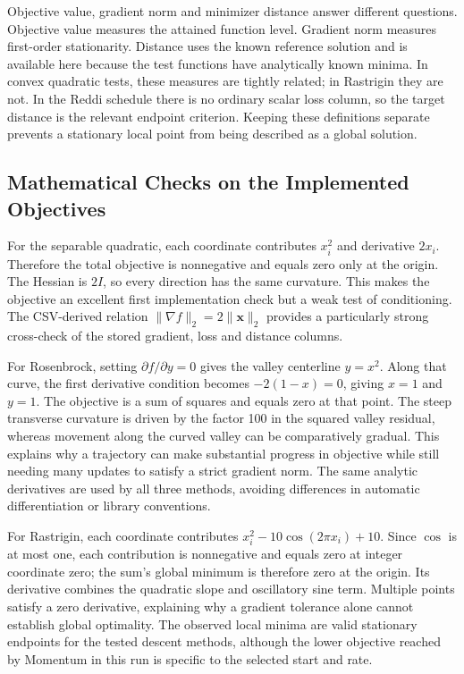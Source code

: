 ﻿\documentclass[conference]{IEEEtran}
\begin{document}
Objective value, gradient norm and minimizer distance answer different questions. Objective value measures the attained function level. Gradient norm measures first-order stationarity. Distance uses the known reference solution and is available here because the test functions have analytically known minima. In convex quadratic tests, these measures are tightly related; in Rastrigin they are not. In the Reddi schedule there is no ordinary scalar loss column, so the target distance is the relevant endpoint criterion. Keeping these definitions separate prevents a stationary local point from being described as a global solution.
\subsection{Mathematical Checks on the Implemented Objectives}
For the separable quadratic, each coordinate contributes $x_i^2$ and derivative $2x_i$. Therefore the total objective is nonnegative and equals zero only at the origin. The Hessian is $2I$, so every direction has the same curvature. This makes the objective an excellent first implementation check but a weak test of conditioning. The CSV-derived relation $\|\nabla f\|_2=2\|\mathbf{x}\|_2$ provides a particularly strong cross-check of the stored gradient, loss and distance columns.

For Rosenbrock, setting $\partial f/\partial y=0$ gives the valley centerline $y=x^2$. Along that curve, the first derivative condition becomes $-2(1-x)=0$, giving $x=1$ and $y=1$. The objective is a sum of squares and equals zero at that point. The steep transverse curvature is driven by the factor 100 in the squared valley residual, whereas movement along the curved valley can be comparatively gradual. This explains why a trajectory can make substantial progress in objective while still needing many updates to satisfy a strict gradient norm. The same analytic derivatives are used by all three methods, avoiding differences in automatic differentiation or library conventions.

For Rastrigin, each coordinate contributes $x_i^2-10\cos(2\pi x_i)+10$. Since $\cos$ is at most one, each contribution is nonnegative and equals zero at integer coordinate zero; the sum's global minimum is therefore zero at the origin. Its derivative combines the quadratic slope and oscillatory sine term. Multiple points satisfy a zero derivative, explaining why a gradient tolerance alone cannot establish global optimality. The observed local minima are valid stationary endpoints for the tested descent methods, although the lower objective reached by Momentum in this run is specific to the selected start and rate.
\end{document}
